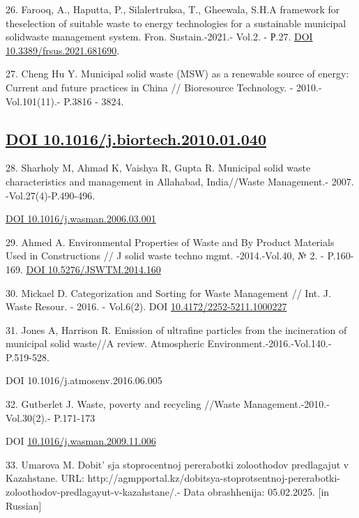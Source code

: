 \begin{references}
26. Farooq, A., Haputta, P., Silalertruksa, T., Gheewala, S.H.A
framework for theselection of suitable waste to energy technologies for
a sustainable municipal solidwaste management system. Fron.
Sustain.-2021.- Vol.2. - Р.27.
\href{https://doi.org/10.3389/frsus.2021.681690}{DOI
10.3389/frsus.2021.681690}.

27. Cheng Hu Y. Municipal solid waste (MSW) as a renewable source of
energy: Current and future practices in China // Bioresource Technology.
- 2010.-Vol.101(11).- P.3816 - 3824.

\subsection{\texorpdfstring{\href{https://doi.org/10.1016/j.biortech.2010.01.040}{DOI
10.1016/j.biortech.2010.01.040}}{DOI 10.1016/j.biortech.2010.01.040}}\label{doi-10.1016j.biortech.2010.01.040-1}

28. Sharholy M, Ahmad K, Vaishya R, Gupta R. Municipal solid waste
characteristics and management in Allahabad, India//Waste Management.-
2007. -Vol.27(4)-P.490-496.

\href{https://doi.org/10.1016/j.wasman.2006.03.001}{DOI
10.1016/j.wasman.2006.03.001}

29. Ahmed A. Environmental Properties of Waste and By Product Materials
Used in Constructions // J solid waste techno mgmt. -2014.-Vol.40, № 2.
- P.160-169. \href{https://doi.org/10.5276/JSWTM.2014.160}{DOI
10.5276/JSWTM.2014.160}

30. Mickael D. Categorization and Sorting for Waste Management // Int.
J. Waste Resour. - 2016. - Vol.6(2). DOI
\href{http://dx.doi.org/10.4172/2252-5211.1000227}{10.4172/2252-5211.1000227}

31. Jones A, Harrison R. Emission of ultrafine particles from the
incineration of municipal solid waste//A review. Atmospheric
Environment.-2016.-Vol.140.-P.519-528.

DOI 10.1016/j.atmosenv.2016.06.005

32. Gutberlet J. Waste, poverty and recycling //Waste
Management.-2010.-Vol.30(2).- P.171-173

DOI
\href{http://dx.doi.org/10.1016/j.wasman.2009.11.006}{10.1016/j.wasman.2009.11.006}

33. Umarova M. Dobit' sja stoprocentnoj pererabotki
zoloothodov predlagajut v Kazahstane. URL:
http://agmpportal.kz/dobitsya-stoprotsentnoj-pererabotki-zoloothodov-predlagayut-v-kazahstane/.-
Data obrashhenija: 05.02.2025. {[}in Russian{]}


\end{references}
